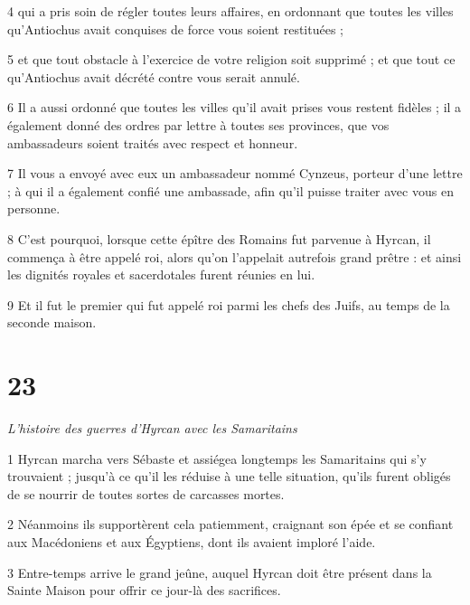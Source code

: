 \par 4 qui a pris soin de régler toutes leurs affaires, en ordonnant que toutes les villes qu'Antiochus avait conquises de force vous soient restituées ;

\par 5 et que tout obstacle à l'exercice de votre religion soit supprimé ; et que tout ce qu'Antiochus avait décrété contre vous serait annulé.

\par 6 Il a aussi ordonné que toutes les villes qu'il avait prises vous restent fidèles ; il a également donné des ordres par lettre à toutes ses provinces, que vos ambassadeurs soient traités avec respect et honneur.

\par 7 Il vous a envoyé avec eux un ambassadeur nommé Cynzeus, porteur d'une lettre ; à qui il a également confié une ambassade, afin qu'il puisse traiter avec vous en personne.

\par 8 C'est pourquoi, lorsque cette épître des Romains fut parvenue à Hyrcan, il commença à être appelé roi, alors qu'on l'appelait autrefois grand prêtre : et ainsi les dignités royales et sacerdotales furent réunies en lui.

\par 9 Et il fut le premier qui fut appelé roi parmi les chefs des Juifs, au temps de la seconde maison.


\chapter{23}

\par \textit{L'histoire des guerres d'Hyrcan avec les Samaritains}

\par 1 Hyrcan marcha vers Sébaste et assiégea longtemps les Samaritains qui s'y trouvaient ; jusqu'à ce qu'il les réduise à une telle situation, qu'ils furent obligés de se nourrir de toutes sortes de carcasses mortes.

\par 2 Néanmoins ils supportèrent cela patiemment, craignant son épée et se confiant aux Macédoniens et aux Égyptiens, dont ils avaient imploré l'aide.

\par 3 Entre-temps arrive le grand jeûne, auquel Hyrcan doit être présent dans la Sainte Maison pour offrir ce jour-là des sacrifices.

